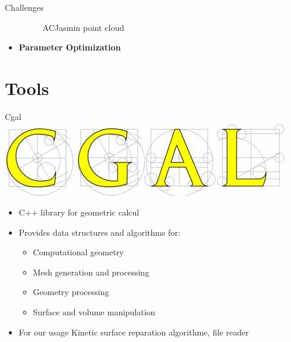 \documentclass[10pt]{beamer}
\begin{document}
\begin{frame}{Challenges}
\begin{itemize}
\begin{figure}[H]
\begin{minipage}[t]{0.20\textwidth}
          \caption*{ACJasmin point cloud}
        \end{minipage}
\end{figure}
    \item \textbf{Parameter Optimization}
\end{itemize}
\end{frame}

\section{Tools}
\begin{frame}{Cgal}
    \includegraphics[scale = 0.2]{../../images/CGAL_logo.png}
    \begin{itemize}
        \item C++ library for geometric calcul 
        \item Provides data structures and algorithms for:
        \begin{itemize}
            \item Computational geometry
            \item Mesh generation and processing
            \item Geometry processing
            \item Surface and volume manipulation
        \end{itemize}
        \item For our usage Kinetic surface reparation algorithme, file reader
    \end{itemize}

\end{frame}
\end{document}
